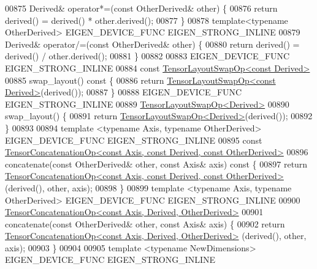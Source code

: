 \begin{DoxyCode}
00875     Derived& operator*=(\textcolor{keyword}{const} OtherDerived& other) \{
00876       \textcolor{keywordflow}{return} derived() = derived() * other.derived();
00877     \}
00878     \textcolor{keyword}{template}<\textcolor{keyword}{typename} OtherDerived> EIGEN\_DEVICE\_FUNC EIGEN\_STRONG\_INLINE
00879     Derived& operator/=(\textcolor{keyword}{const} OtherDerived& other) \{
00880       \textcolor{keywordflow}{return} derived() = derived() / other.derived();
00881     \}
00882 
00883     EIGEN\_DEVICE\_FUNC EIGEN\_STRONG\_INLINE
00884     \textcolor{keyword}{const} \hyperlink{class_eigen_1_1_tensor_layout_swap_op}{TensorLayoutSwapOp<const Derived>}
00885     swap\_layout()\textcolor{keyword}{ const }\{
00886       \textcolor{keywordflow}{return} \hyperlink{class_eigen_1_1_tensor_layout_swap_op}{TensorLayoutSwapOp<const Derived>}(derived());
00887     \}
00888     EIGEN\_DEVICE\_FUNC EIGEN\_STRONG\_INLINE
00889     \hyperlink{class_eigen_1_1_tensor_layout_swap_op}{TensorLayoutSwapOp<Derived>}
00890     swap\_layout() \{
00891       \textcolor{keywordflow}{return} \hyperlink{class_eigen_1_1_tensor_layout_swap_op}{TensorLayoutSwapOp<Derived>}(derived());
00892     \}
00893 
00894     \textcolor{keyword}{template} <\textcolor{keyword}{typename} Axis, \textcolor{keyword}{typename} OtherDerived> EIGEN\_DEVICE\_FUNC EIGEN\_STRONG\_INLINE
00895     \textcolor{keyword}{const} \hyperlink{class_eigen_1_1_tensor_concatenation_op}{TensorConcatenationOp<const Axis, const Derived, const OtherDerived>}
00896     concatenate(\textcolor{keyword}{const} OtherDerived& other, \textcolor{keyword}{const} Axis& axis)\textcolor{keyword}{ const }\{
00897       \textcolor{keywordflow}{return} 
      \hyperlink{class_eigen_1_1_tensor_concatenation_op}{TensorConcatenationOp<const Axis, const Derived, const OtherDerived>}
      (derived(), other, axis);
00898     \}
00899     \textcolor{keyword}{template} <\textcolor{keyword}{typename} Axis, \textcolor{keyword}{typename} OtherDerived> EIGEN\_DEVICE\_FUNC EIGEN\_STRONG\_INLINE
00900     \hyperlink{class_eigen_1_1_tensor_concatenation_op}{TensorConcatenationOp<const Axis, Derived, OtherDerived>}
00901     concatenate(\textcolor{keyword}{const} OtherDerived& other, \textcolor{keyword}{const} Axis& axis) \{
00902       \textcolor{keywordflow}{return} \hyperlink{class_eigen_1_1_tensor_concatenation_op}{TensorConcatenationOp<const Axis, Derived, OtherDerived>}
      (derived(), other, axis);
00903     \}
00904 
00905     \textcolor{keyword}{template} <\textcolor{keyword}{typename} NewDimensions> EIGEN\_DEVICE\_FUNC EIGEN\_STRONG\_INLINE

\end{DoxyCode}
